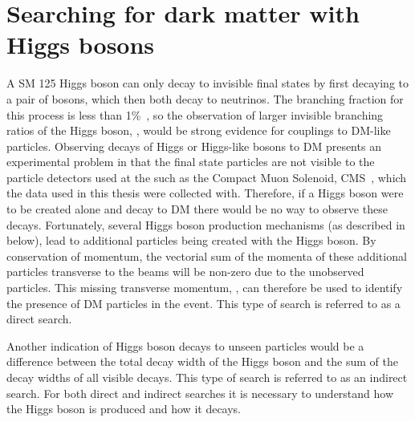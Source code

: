 \section{Searching for dark matter with Higgs bosons}
\label{sec:higgsdm}
A \ac{SM} 125 \GeV Higgs boson can only decay to invisible final states by first decaying to a pair of \PZ bosons, which then both decay to neutrinos. The branching fraction for this process is less than 1\%~\cite{Heinemeyer:1559921}, so the observation of larger invisible branching ratios of the Higgs boson, \BRinv, would be strong evidence for couplings to \ac{DM}-like particles. Observing decays of Higgs or Higgs-like bosons to \ac{DM} presents an experimental problem in that the final state particles are not visible to the particle detectors used at the \LHC such as the Compact Muon Solenoid, CMS~\cite{Chatrchyan:2008aa}, which the data used in this thesis were collected with. Therefore, if a Higgs boson were to be created alone and decay to \ac{DM} there would be no way to observe these decays. Fortunately, several Higgs boson production mechanisms (as described in  below), lead to additional particles being created with the Higgs boson. By conservation of momentum, the vectorial sum of the momenta of these additional particles transverse to the \LHC beams will be non-zero due to the unobserved particles. This missing transverse momentum, \MET, can therefore be used to identify the presence of \ac{DM} particles in the event. This type of search is referred to as a direct search.

Another indication of Higgs boson decays to unseen particles would be a difference between the total decay width of the Higgs boson and the sum of the decay widths of all visible decays. This type of search is referred to as an indirect search. For both direct and indirect searches it is necessary to understand how the Higgs boson is produced and how it decays.

